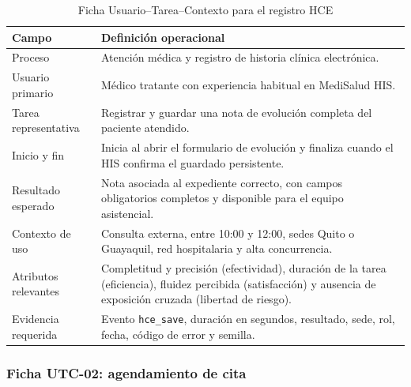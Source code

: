 \begin{table}[H]
\centering
\caption{Ficha Usuario--Tarea--Contexto para el registro HCE}
\label{tab:utc-hce}
\begin{tabularx}{\textwidth}{p{3.5cm}Y}
\toprule
Campo & Definición operacional \\
\midrule
Proceso & Atención médica y registro de historia clínica electrónica. \\
Usuario primario & Médico tratante con experiencia habitual en MediSalud HIS. \\
Tarea representativa & Registrar y guardar una nota de evolución completa del paciente atendido. \\
Inicio y fin & Inicia al abrir el formulario de evolución y finaliza cuando el HIS confirma el guardado persistente. \\
Resultado esperado & Nota asociada al expediente correcto, con campos obligatorios completos y disponible para el equipo asistencial. \\
Contexto de uso & Consulta externa, entre 10:00 y 12:00, sedes Quito o Guayaquil, red hospitalaria y alta concurrencia. \\
Atributos relevantes & Completitud y precisión (efectividad), duración de la tarea (eficiencia), fluidez percibida (satisfacción) y ausencia de exposición cruzada (libertad de riesgo). \\
Evidencia requerida & Evento \texttt{hce\_save}, duración en segundos, resultado, sede, rol, fecha, código de error y semilla. \\
\bottomrule
\end{tabularx}
\end{table}

\subsubsection{Ficha UTC-02: agendamiento de cita}

